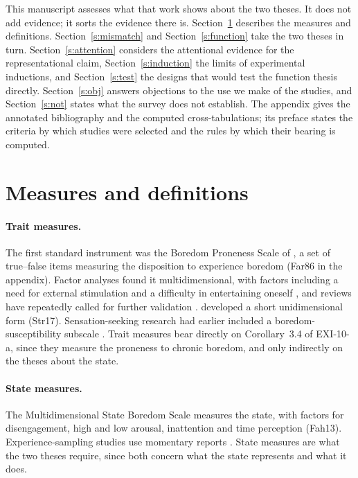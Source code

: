 \documentclass{situationist-preprint}
\begin{document}
This manuscript assesses what that work shows about the two theses. It does not add evidence; it sorts the evidence there is. Section~\ref{s:measures} describes the measures and definitions. Section~\ref{s:mismatch} and Section~\ref{s:function} take the two theses in turn. Section~\ref{s:attention} considers the attentional evidence for the representational claim, Section~\ref{s:induction} the limits of experimental inductions, and Section~\ref{s:test} the designs that would test the function thesis directly. Section~\ref{s:obj} answers objections to the use we make of the studies, and Section~\ref{s:not} states what the survey does not establish. The appendix gives the annotated bibliography and the computed cross-tabulations; its preface states the criteria by which studies were selected and the rules by which their bearing is computed.

\section{Measures and definitions}\label{s:measures}

\paragraph{Trait measures.} The first standard instrument was the Boredom Proneness Scale of \citet{FarmerSundberg1986}, a set of true--false items measuring the disposition to experience boredom (Far86 in the appendix). Factor analyses found it multidimensional, with factors including a need for external stimulation and a difficulty in entertaining oneself \citep{VodanovichKass1990}, and reviews have repeatedly called for further validation \citep{Vodanovich2003,VodanovichWatt2016}. \citet{Struk2017} developed a short unidimensional form (Str17). Sensation-seeking research had earlier included a boredom-susceptibility subscale \citep{Zuckerman1979}. Trait measures bear directly on Corollary~3.4 of EXI-10-a, since they measure the proneness to chronic boredom, and only indirectly on the theses about the state.

\paragraph{State measures.} The Multidimensional State Boredom Scale \citep{Fahlman2013} measures the state, with factors for disengagement, high and low arousal, inattention and time perception (Fah13). Experience-sampling studies use momentary reports \citep{LarsonRichards1991,Goetz2014,Chin2017}. State measures are what the two theses require, since both concern what the state represents and what it does.
\end{document}
